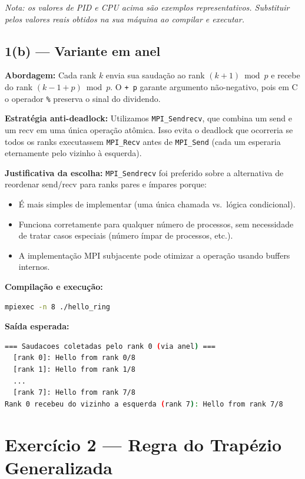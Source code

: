 \documentclass[12pt,a4paper]{article}
\begin{document}
\textit{Nota: os valores de PID e CPU acima são exemplos representativos.
Substituir pelos valores reais obtidos na sua máquina ao compilar e executar.}

\subsection{1(b) — Variante em anel}

\textbf{Abordagem:} Cada rank $k$ envia sua saudação ao rank $(k+1) \bmod p$ e
recebe do rank $(k-1+p) \bmod p$. O \texttt{+ p} garante argumento não-negativo,
pois em C o operador \texttt{\%} preserva o sinal do dividendo.

\textbf{Estratégia anti-deadlock:} Utilizamos \texttt{MPI\_Sendrecv}, que combina
um send e um recv em uma única operação atômica. Isso evita o deadlock que ocorreria
se todos os ranks executassem \texttt{MPI\_Recv} antes de \texttt{MPI\_Send} (cada
um esperaria eternamente pelo vizinho à esquerda).

\textbf{Justificativa da escolha:} \texttt{MPI\_Sendrecv} foi preferido sobre a
alternativa de reordenar send/recv para ranks pares e ímpares porque:
\begin{itemize}
    \item É mais simples de implementar (uma única chamada vs.\ lógica condicional).
    \item Funciona corretamente para qualquer número de processos, sem necessidade
    de tratar casos especiais (número ímpar de processos, etc.).
    \item A implementação MPI subjacente pode otimizar a operação usando buffers
    internos.
\end{itemize}

\textbf{Compilação e execução:}
\begin{lstlisting}[language=bash]
mpiexec -n 8 ./hello_ring
\end{lstlisting}

\textbf{Saída esperada:}
\begin{lstlisting}[language=bash,numbers=none]
=== Saudacoes coletadas pelo rank 0 (via anel) ===
  [rank 0]: Hello from rank 0/8
  [rank 1]: Hello from rank 1/8
  ...
  [rank 7]: Hello from rank 7/8
Rank 0 recebeu do vizinho a esquerda (rank 7): Hello from rank 7/8
\end{lstlisting}

\section{Exercício 2 — Regra do Trapézio Generalizada}
\end{document}
